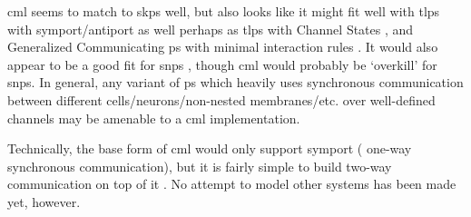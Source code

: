 \gls{cml} seems to match to \gls{skps} well, but also looks like it might fit well with \gls{tlps} with symport/antiport \cite{Verlan2005} as well perhaps as \gls{tlps} with Channel States \cite{Song2016}, and Generalized Communicating \gls{ps} with minimal interaction rules \cite{Csuhaj-Varju2011}.  It would also appear to be a good fit for \gls{snps} \cite{Ionescu2006}, though \gls{cml} would probably be `overkill' for \gls{snps}.  In general, any variant of \gls{ps} which heavily uses synchronous communication between different cells/neurons/non-nested membranes/etc. over well-defined channels may be amenable to a \gls{cml} implementation.

Technically, the base form of \gls{cml} would only support symport (\ie{} one-way synchronous communication), but it is fairly simple to build two-way communication on top of it \cite[ch.~6]{Reppy2007}.  No attempt to model other systems has been made yet, however.
